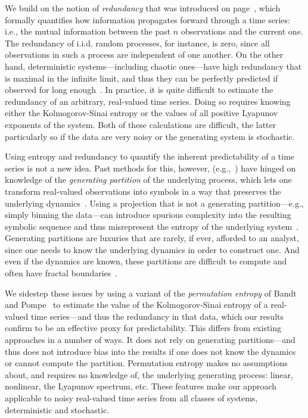 We build on the notion of \emph{redundancy} that was introduced on
page~\pageref{page:redundancy}, which formally quantifies how
information propagates forward through a time series:
i.e., the mutual information between the past $n$ observations and the
current one.
%
The redundancy of i.i.d. random processes, for instance, is zero,
since all observations in such a process are independent of one
another.  On the other hand, deterministic systems---including chaotic
ones---have high redundancy that is maximal in the infinite limit, and
thus they can be perfectly predicted if observed for long
enough~\cite{weigend93}.  In practice, it is quite difficult to
estimate the redundancy of an arbitrary, real-valued time series.
Doing so requires knowing either the Kolmogorov-Sinai entropy or the
values of all positive Lyapunov exponents of the system.  Both of
these calculations are difficult, the latter particularly so if the
data are very noisy or the generating system is stochastic.

Using entropy and redundancy to quantify the inherent predictability
of a time series is not a new idea.  Past methods for this, however,
(e.g.,~\cite{Shannon1951, mantegna1994linguistic}) have hinged on
knowledge of the \emph{generating partition} of the underlying
process, which lets one transform real-valued observations into
symbols in a way that preserves the underlying dynamics~\cite{lind95}.
Using a projection that is not a generating partition---e.g., simply
binning the data---can introduce spurious complexity into the
resulting symbolic sequence and thus misrepresent the entropy of the
underlying system~\cite{bollt2001}.  Generating partitions are
luxuries that are rarely, if ever, afforded to an analyst, since one
needs to know the underlying dynamics in order to construct one.  And
even if the dynamics are known, these partitions are difficult to
compute and often have fractal boundaries~\cite{eisele1999}.

We sidestep these issues by using a variant of the \emph{permutation
  entropy} of Bandt and Pompe~\cite{bandt2002per} to estimate the
value of the Kolmogorov-Sinai entropy of a real-valued time
series---and thus the redundancy in that data, which our results
confirm to be an effective proxy for predictability.  This differs
from existing approaches in a number of ways.  It does not rely on
generating partitions---and thus does not introduce bias into the
results if one does not know the dynamics or cannot compute the
partition.  Permutation entropy makes no assumptions about, and
requires no knowledge of, the underlying generating process: linear,
nonlinear, the Lyapunov spectrum, etc.  These features make our
approach applicable to noisy real-valued time series from all classes
of systems, deterministic and stochastic.

